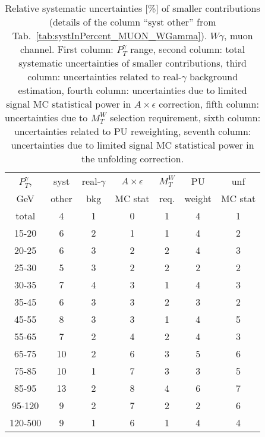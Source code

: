\begin{table}[h]
  \scriptsize
  \begin{center}
  \caption{Relative systematic uncertainties [\%] of smaller contributions (details of the column ``syst other'' from Tab.~\ref{tab:systInPercent_MUON_WGamma}). $W\gamma$, muon channel. First column: $P_T^{\gamma}$ range, second column: total systematic uncertainties of smaller contributions, third column: uncertainties related to real-$\gamma$ background estimation, fourth column: uncertainties due to limited signal MC statistical power in $A\times\epsilon$ correction, fifth column: uncertainties due to $M_T^W$ selection requirement,  sixth column: uncertainties related to PU reweighting, seventh column:  uncertainties due to limited signal MC statistical power in the unfolding correction.}
  \begin{tabular}{|c|c|c|c|c|c|c|}
    $P_T^{\gamma}$,  & syst  & real-$\gamma$ & $A\times\epsilon$ & $M_T^W$ & PU    & unf      \\
    GeV            & other & bkg           & MC stat           & req.   & weight & MC stat \\ \hline
    total  & 4 & 1 & 0 & 1 & 4 & 1 \\ \hline
    15-20 & 6 & 2 & 1 & 1 & 4 & 2 \\ \hline
    20-25 & 6 & 3 & 2 & 2 & 4 & 3 \\ \hline
    25-30 & 5 & 3 & 2 & 2 & 2 & 2 \\ \hline
    30-35 & 7 & 4 & 3 & 1 & 4 & 3 \\ \hline
    35-45 & 6 & 3 & 3 & 2 & 3 & 2 \\ \hline
    45-55 & 8 & 3 & 3 & 1 & 4 & 5 \\ \hline
    55-65 & 7 & 2 & 4 & 2 & 4 & 3 \\ \hline
    65-75 & 10 & 2 & 6 & 3 & 5 & 6 \\ \hline
    75-85 & 10 & 1 & 7 & 3 & 3 & 5 \\ \hline
    85-95 & 13 & 2 & 8 & 4 & 6 & 7 \\ \hline
    95-120 & 9 & 2 & 7 & 2 & 2 & 6 \\ \hline
    120-500 & 9 & 1 & 6 & 1 & 4 & 4 \\ \hline
  \end{tabular}
  \label{tab:systInPercentSmallSysts_MUON_WGamma}
  \end{center}
\end{table}

